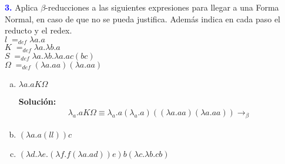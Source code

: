 \textbf{\textcolor{blue}{3.}} \Large
Aplica $\beta$-reducciones a las siguientes expresiones
para llegar a una Forma Normal, en caso de que no se pueda justifica. Además indica
en cada paso el reducto y el redex.\\

$l\;=_{def} \lambda a.a$\\
$K\;=_{def} \lambda a.\lambda b.a$\\
$S\;=_{def} \lambda a.\lambda b.\lambda a.ac(bc)$\\
$\Omega\; =_{def} (\lambda a.aa) (\lambda a.aa)$

\begin{enumerate}[a)]
    \item $\lambda a.aK\Omega$

    \textbf{Solución:}
    \begin{eqnarray*}
        \lambda_a .aK\Omega \equiv \lambda_a .a (\lambda_a .a)((\lambda a.aa) (\lambda a.aa))
        \rightarrow_{\beta}
    \end{eqnarray*}
    \item $(\lambda a.a(ll))c$
    \item $(\lambda d.\lambda e.(\lambda f.f(\lambda a.ad))e)b(\lambda c.\lambda b.cb)$
\end{enumerate}
